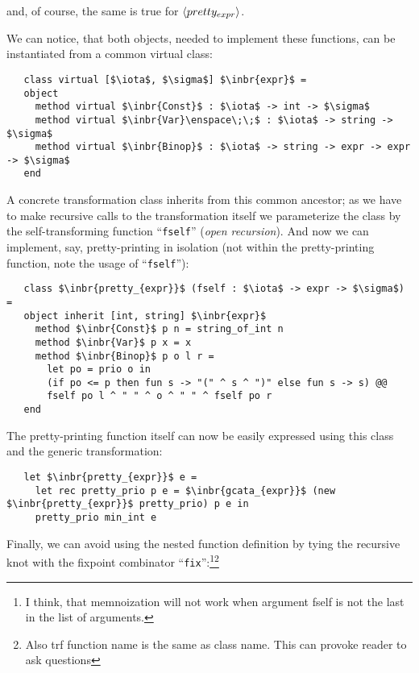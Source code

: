 and, of course, the same is true for $\left<pretty_{expr}\right>$.

We can notice, that both objects, needed to implement these functions, can be instantiated from a common virtual class:

\begin{lstlisting}
   class virtual [$\iota$, $\sigma$] $\inbr{expr}$ =
   object
     method virtual $\inbr{Const}$ : $\iota$ -> int -> $\sigma$
     method virtual $\inbr{Var}\enspace\;\;$ : $\iota$ -> string -> $\sigma$
     method virtual $\inbr{Binop}$ : $\iota$ -> string -> expr -> expr -> $\sigma$  
   end
\end{lstlisting}

A concrete transformation class inherits from this common ancestor; as we have to make recursive calls to the transformation 
itself we parameterize the class by the self-transforming function ``\lstinline{fself}'' (\emph{open recursion}). And now we can implement, say,
pretty-printing in isolation (not within the pretty-printing function, note the usage of ``\lstinline{fself}''):

\begin{lstlisting}
   class $\inbr{pretty_{expr}}$ (fself : $\iota$ -> expr -> $\sigma$) =
   object inherit [int, string] $\inbr{expr}$ 
     method $\inbr{Const}$ p n = string_of_int n
     method $\inbr{Var}$ p x = x
     method $\inbr{Binop}$ p o l r =
       let po = prio o in
       (if po <= p then fun s -> "(" ^ s ^ ")" else fun s -> s) @@
       fself po l ^ " " ^ o ^ " " ^ fself po r
   end
\end{lstlisting}

The pretty-printing function itself can now be easily expressed using this class and the generic transformation:

\begin{lstlisting}
   let $\inbr{pretty_{expr}}$ e =
     let rec pretty_prio p e = $\inbr{gcata_{expr}}$ (new $\inbr{pretty_{expr}}$ pretty_prio) p e in
     pretty_prio min_int e
\end{lstlisting}

Finally, we can avoid using the nested function definition by tying the recursive knot with the fixpoint combinator ``\lstinline{fix}'':\footnote{I think, that memnoization will not work
when argument fself is not the last in the list of arguments.}\footnote{ Also trf function name is the same as class name. This can provoke reader to ask questions}

